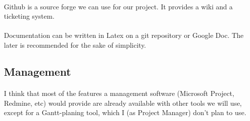 \paragraph{} Github is a source forge we can use for our project. It provides a
wiki and a ticketing system.

\paragraph{} Documentation can be written in Latex on a git repository or Google
Doc. The later is recommended for the sake of simplicity.

\subsection{Management}

\paragraph{} I think that most of the features a management software (Microsoft
Project, Redmine, etc) would provide are already available with other tools we
will use, except for a Gantt-planing tool, which I (as Project Manager) don't
plan to use.
